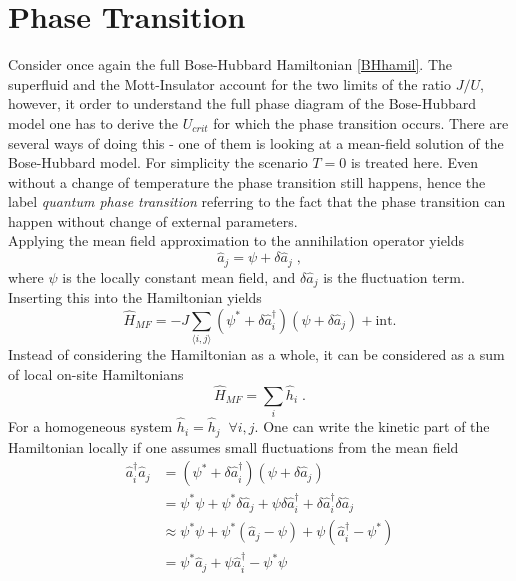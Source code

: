 \section{Phase Transition}
Consider once again the full Bose-Hubbard Hamiltonian \ref{BHhamil}. The superfluid and the Mott-Insulator account for the two limits of the ratio $J/U$, however, it order to understand the full phase diagram of the Bose-Hubbard model one has to derive the $U_{crit}$ for which the phase transition occurs. There are several ways of doing this - one of them is looking at a mean-field solution of the Bose-Hubbard model. For simplicity the scenario $T=0$ is treated here. Even without a change of temperature the phase transition still happens, hence the label \textit{quantum phase transition} referring to the fact that the phase transition can happen without change of external parameters.\\
Applying the mean field approximation to the annihilation operator yields
\begin{equation}
	\hat{a}_j = \psi + \delta \hat{a}_j \; ,
\end{equation}
where $\psi$ is the locally constant mean field, and $\delta \hat{a}_j$ is the fluctuation term. Inserting this into the Hamiltonian yields
\begin{equation}
	\hat{H}_{MF} = -J \sum_{\langle i,j \rangle} \left( \psi^* + \delta \hat{a}_{i}^{\dag} \right) \left( \psi + \delta \hat{a}_{j} \right) + \text{int.}
\end{equation}
Instead of considering the Hamiltonian as a whole, it can be considered as a sum of local on-site Hamiltonians
\begin{equation}
	\hat{H}_{MF} = \sum_{i} \hat{h}_i \; .
\end{equation}
For a homogeneous system $\hat{h}_i = \hat{h}_j \; \; \forall i,j$. One can write the kinetic part of the Hamiltonian locally if one assumes small fluctuations from the mean field
\begin{align}
  \hat{a}_{i}^{\dag} \hat{a}_{j} &= \left( \psi^* + \delta \hat{a}_{i}^{\dag} \right) \left( \psi + \delta \hat{a}_{j} \right) \nonumber \\
  &= \psi^* \psi + \psi^* \delta \hat{a}_j + \psi \delta \hat{a}_{i}^{\dag} + \delta \hat{a}_{i}^{\dag} \delta \hat{a}_{j} \nonumber \\
  & \approx \psi^* \psi + \psi^* \left( \hat{a}_j - \psi \right) + \psi \left( \hat{a}_{i}^{\dag} - \psi^* \right) \nonumber \\
&= \psi^* \hat{a}_j + \psi \hat{a}_{i}^{\dag} - \psi^* \psi
\end{align}
